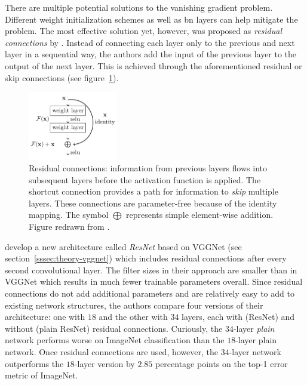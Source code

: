 \documentclass[draft,final]{vutinfth} %
\begin{document}
There are multiple potential solutions to the vanishing gradient
problem. Different weight initialization schemes
\cite{glorot2010,sussillo2015} as well as \gls{bn} layers
\cite{ioffe2015} can help mitigate the problem. The most effective
solution yet, however, was proposed as \emph{residual connections} by
\textcite{he2016}. Instead of connecting each layer only to the
previous and next layer in a sequential way, the authors add the input
of the previous layer to the output of the next layer. This is
achieved through the aforementioned residual or skip connections (see
figure~\ref{fig:residual-connection}).

\begin{figure}
  \centering
  \includegraphics[width=0.35\textwidth]{graphics/residual-connection/res.pdf}
  \caption[Residual connection]{Residual connections: information from
    previous layers flows into subsequent layers before the activation
    function is applied. The shortcut connection provides a path for
    information to \emph{skip} multiple layers. These connections are
    parameter-free because of the identity mapping. The symbol
    $\bigoplus$ represents simple element-wise addition. Figure
    redrawn from \textcite{he2016}.}
  \label{fig:residual-connection}
\end{figure}

\textcite{he2016} develop a new architecture called \emph{ResNet}
based on VGGNet (see section~\ref{sssec:theory-vggnet}) which includes
residual connections after every second convolutional layer. The
filter sizes in their approach are smaller than in VGGNet which
results in much fewer trainable parameters overall. Since residual
connections do not add additional parameters and are relatively easy
to add to existing network structures, the authors compare four
versions of their architecture: one with $18$ and the other with $34$
layers, each with (ResNet) and without (plain ResNet) residual
connections. Curiously, the $34$-layer \emph{plain} network performs
worse on ImageNet classification than the $18$-layer plain
network. Once residual connections are used, however, the $34$-layer
network outperforms the $18$-layer version by $2.85$ percentage points
on the top-1 error metric of ImageNet.
\end{document}
